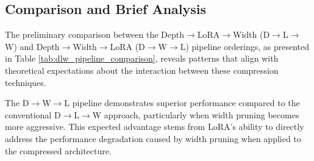 \subsection{Comparison and Brief Analysis}

The preliminary comparison between the Depth$\rightarrow$LoRA$\rightarrow$Width (D$\rightarrow$L$\rightarrow$W) and Depth$\rightarrow$Width$\rightarrow$LoRA (D$\rightarrow$W$\rightarrow$L) pipeline orderings, as presented in Table \ref{tab:dlw_pipeline_comparison}, reveals patterns that align with theoretical expectations about the interaction between these compression techniques.

The D$\rightarrow$W$\rightarrow$L pipeline demonstrates superior performance compared to the conventional D$\rightarrow$L$\rightarrow$W approach, particularly when width pruning becomes more aggressive. This expected advantage stems from LoRA's ability to directly address the performance degradation caused by width pruning when applied to the compressed architecture.

